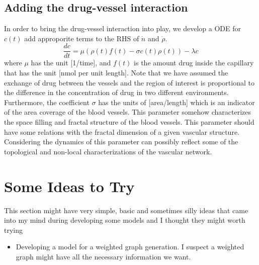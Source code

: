 

\subsection*{Adding the drug-vessel interaction}
In order to bring the drug-vessel interaction into play, we develop a ODE for $c(t)$ add approporite terms to the RHS of $\dot{n}$ and $\dot{\rho}$.
\[ \frac{dc}{dt} = \mu (\rho(t)f(t) - \sigma c(t)\rho(t)) - \boxed{\lambda c} \]
where $\mu$ has the unit [1/time], and $f(t)$ is the amount drug inside the capillary that has the unit [nmol per unit length]. Note that we have assumed the exchange of drug between the vessels and the region of interest is proportional to the difference in the concentration of drug in two different environments. Furthermore, the coefficient $\sigma$ has the units of [area/length] which is an indicator of the area coverage of the blood vessels. This parameter somehow characterizes the space filling and fractal structure of the blood vessels. This parameter should have some relations with the fractal dimension of a given vascular structure. Considering the dynamics of this parameter can possibly reflect some of the topological and non-local characterizations of the vascular network.



\newpage

\section{Some Ideas to Try}
This section might have very simple, basic and sometimes silly ideas that came into my mind during developing some models and I thought they might worth trying
\begin{itemize}
	\item Developing a model for a weighted graph generation. I suspect a weighted graph might have all the necessary information we want.
\end{itemize}